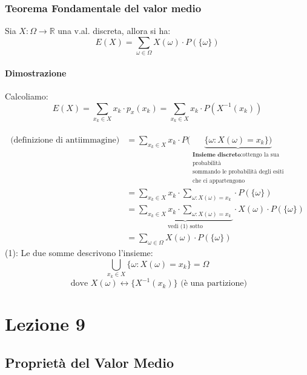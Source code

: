 \documentclass{report}
\begin{document}
\subsection{Teorema Fondamentale del valor medio}
Sia \(X: \Omega \xrightarrow{} \mathbb{R}\) una v.al. discreta, allora si ha:
\[E(X) = \sum_{\omega \in \Omega} X(\omega)\cdot P(\{\omega\})\]
\subsubsection{Dimostrazione}
Calcoliamo:
    \[E(X) = \sum_{x_k \in \textit{X}} x_k \cdot p_x (x_k)  = \sum_{x_k \in \textit{X}} x_k \cdot P(X^{-1}(x_k))\]\\
    \begin{align}
    \text{(definizione di antiimmagine)} & = \sum_{x_k \in \textit{X}} x_k \cdot P(\underbrace{\{\omega: X(\omega) = x_k\})}_\substack{
    \textbf{Insieme discreto}: \text{ottengo la sua} \\
    \text{probabilità} \\
    \text{sommando le probabilità degli esiti}\\
    \text{che ci appartengono}}\\
    & = \sum_{x_k \in \textit{X}}x_k \cdot \sum_{\omega: X(\omega) = x_k} \cdot P(\{\omega\})\\
    & = \underbrace{\sum_{x_k \in \textit{X}}x_k \cdot \sum_{\omega: X(\omega) = x_k}}_\text{vedi (1) sotto} \cdot X(\omega) \cdot P(\{\omega\})\\
    & = \sum_{\omega \in \Omega} X(\omega) \cdot P(\{\omega\})
    \end{align}
    (1): Le due somme descrivono l'insieme: \[\bigcup_{x_k \in \textit{X}} \{\omega : X(\omega) = x_k\} = \Omega\]
    \[\text{ dove } X(\omega) \longleftrightarrow \{X^{-1}(x_k)\} \text{ (è una partizione)}\]
\chapter{Lezione 9}
\section{Proprietà del Valor Medio}
\end{document}
